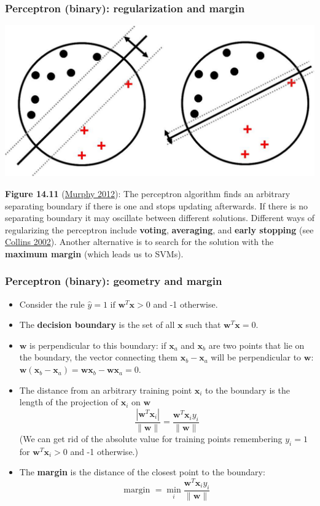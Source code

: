 \documentclass[ignorenonframetext,plain]{beamer}
\renewcommand{\vec}{\mathbf}
\begin{document}
\begin{frame}\frametitle{Perceptron (binary): regularization and margin}
\begin{center}
\includegraphics[width=\textwidth]{images/largeMarginPrinciple2.pdf}
\end{center}\footnotesize
{\bf Figure 14.11} (\href{http://www.cs.ubc.ca/~murphyk/MLbook}{Murphy
  2012}): The perceptron algorithm finds an arbitrary separating
boundary if there is one and stops updating afterwards.  If there is
no separating boundary it may oscillate between different solutions.
Different ways of regularizing the perceptron include {\bf voting},
{\bf averaging}, and {\bf early stopping} (see
\href{http://aclweb.org/anthology//W/W02/W02-1001.pdf}{Collins 2002}).
Another alternative is to search for the solution with the {\bf
  maximum margin} (which leads us to SVMs).
\end{frame}

\begin{frame}\frametitle{Perceptron (binary): geometry and margin}
\begin{itemize}
\item Consider the rule $ \hat{y} = 1 \text{ if } \vec{w}^T
  \vec{x} > 0$ and -1 otherwise.
\item The {\bf decision boundary} is the set of all $\vec{x}$ such
  that $\vec{w}^T \vec{x} = 0$.
\item $\vec{w}$ is perpendicular to this boundary: if $\vec{x}_a$ and
  $\vec{x}_b$ are two points that lie on the boundary, the vector
  connecting them $\vec{x}_b - \vec{x}_a$ will be perpendicular to
  $\vec{w}$: $\vec{w}(\vec{x}_b - \vec{x}_a) = \vec{w}\vec{x}_b -
  \vec{w}\vec{x}_a = 0$.
\item The distance from an arbitrary training point $\vec{x}_i$ to the
  boundary is the length of the projection of $\vec{x}_i$ on
  $\vec{w}$ \[
  \frac{|\vec{w}^T\vec{x}_i|}{\|\vec{w}\|} = \frac{\vec{w}^T\vec{x}_i y_i}{\|\vec{w}\|}
\]
(We can get rid of the absolute value for training points
  remembering $y_i=1$ for $\vec{w}^T\vec{x}_i>0$ and -1 otherwise.)
\item The {\bf margin} is the distance of the closest point to the
  boundary:\[
  \text{margin } = \min_i \frac{\vec{w}^T\vec{x}_i y_i}{\|\vec{w}\|}
\]
\end{itemize}
\end{frame}
\end{document}
